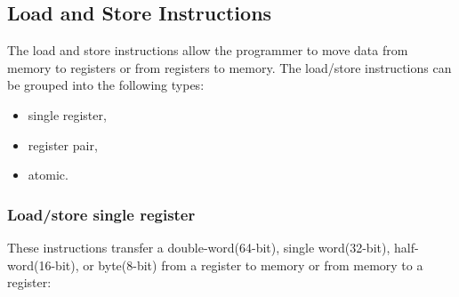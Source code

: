 \begin{table}[h!]\centering
\caption{Pre-index, Post-index and Pre-index with Update}
\end{table}

\newpage
\subsection{Load and Store Instructions}
The load and store instructions allow the programmer to move data from memory to registers
or from registers to memory. The load/store instructions can be grouped into the following
types:
\begin{itemize}
	\item single register,
	\item register pair,
	\item atomic.
\end{itemize}

\subsubsection{Load/store single register}
These instructions transfer a double-word(64-bit), single word(32-bit), half-word(16-bit), or byte(8-bit) from a register to memory or from memory to a register:

